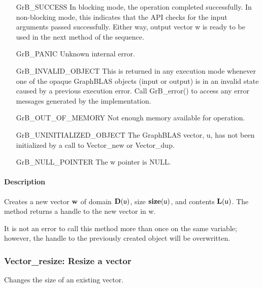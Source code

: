 \begin{itemize}[leftmargin=2.1in]
    \item[{\sf GrB\_SUCCESS}]         In blocking mode, the operation completed
    successfully. In non-blocking mode, this indicates that the API checks 
    for the input arguments passed successfully. Either way, output vector 
    {\sf w} is ready to be used in the next method of the sequence.

    \item[{\sf GrB\_PANIC}]           Unknown internal error.
    
    \item[{\sf GrB\_INVALID\_OBJECT}] This is returned in any execution mode 
    whenever one of the opaque GraphBLAS objects (input or output) is in an invalid 
    state caused by a previous execution error.  Call {\sf GrB\_error()} to access 
    any error messages generated by the implementation.

    \item[{\sf GrB\_OUT\_OF\_MEMORY}] Not enough memory available for operation.
    
    \item[{\sf GrB\_UNINITIALIZED\_OBJECT}]  The GraphBLAS vector, {\sf u}, has 
    not been initialized by a call to {\sf Vector\_new} or {\sf Vector\_dup}.
    
    \item[{\sf GrB\_NULL\_POINTER}]  The {\sf w} pointer is {\sf NULL}.
\end{itemize}

\paragraph{Description}

Creates a new vector ${\bf w}$ of domain $\mathbf{D}({\sf u})$, size 
$\mathbf{size}({\sf u})$, and contents $\mathbf{L}({\sf u})$. The method returns a 
handle to the new vector in {\sf w}.

It is not an error to call this method more than once on the same variable;  
however, the handle to the previously created object will be overwritten. 

\subsubsection{{\sf Vector\_resize}: Resize a vector}

Changes the size of an existing vector.

